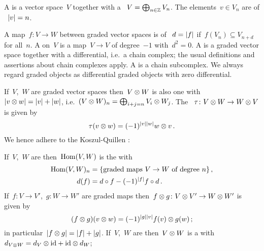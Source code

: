 \documentclass[a4paper,10pt,headings=standardclasses]{scrartcl}
\begin{document}
A  is a vector space~$V$ together with a ~$V = \bigoplus_{n \in \mathbb{Z}} V_n$.
The elements~$v \in V_n$ are  of ~$\lvert v\rvert = n$.
\begin{center}
\end{center}
A map~$f \colon V \to W$ between graded vector spaces is  of ~$d = \lvert f\rvert$ if~$f(V_n) \subseteq V_{n+d}$ for all~$n$.
A  on~$V$ is a map~$V \to V$ of degree~$-1$ with~$d^2 = 0$.
A  is a graded vector space together with a differential, i.e.\ a chain complex;
the usual definitions and assertions about chain complexes apply.
A  is a chain subcomplex.
We always regard graded objects as differential graded objects with zero differential.
\begin{center}
\end{center}
If~$V$,~$W$ are graded vector spaces then~$V \otimes W$ is also one with~$\lvert v \otimes w\rvert = \lvert v\rvert + \lvert w\rvert$, i.e.~$(V \otimes W)_n = \bigoplus_{i+j=n} V_i \otimes W_j$.
The ~$\tau \colon V \otimes W \to W \otimes V$ is given by
\[
  \tau(v \otimes w)
  =
  (-1)^{\lvert v\rvert \lvert w\rvert}
  w \otimes v \,.
\]
We hence adhere to the Koszul-Quillen :
\begin{center}
\end{center}
If~$V$,~$W$ are {\dgvs} then~$\operatorname{Hom}(V,W)$ is the {\dgv} with
\begin{align*}
  \operatorname{Hom}(V,W)_n
  &=
  \{
    \text{graded maps~$V \to W$ of degree~$n$}
  \} \,,
  \\
  d(f)
  &=
  d \circ f - (-1)^{\lvert f\rvert} f \circ d \,.
\end{align*}
If~$f \colon V \to V'$,~$g \colon W \to W'$ are graded maps then~$f \otimes g \colon V \otimes V' \to W \otimes W'$ is given by
\[
  (f \otimes g)(v \otimes w)
  =
  (-1)^{\lvert g\rvert \lvert v\rvert}
  f(v) \otimes g(w) \,;
\]
in particular~$\lvert f \otimes g\rvert = \lvert f\rvert + \lvert g\rvert$.
If~$V$,~$W$ are {\dgvs} then~$V \otimes W$ is a {\dgv} with~$d_{V \otimes W} = d_V \otimes {\operatorname{id}} + {\operatorname{id}} \otimes d_W$;
\end{document}
